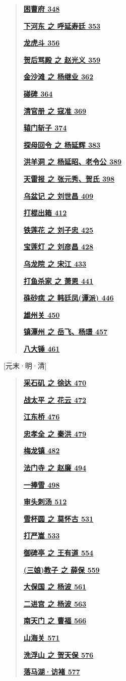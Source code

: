 \begin{quote}
\href{/l}{\textbf{困曹府 348}}

\href{/l}{\textbf{下河东 之 呼延寿廷 353}}

\href{/l}{\textbf{龙虎斗 356}}

\href{/l}{\textbf{贺后骂殿 之 赵光义 359}}

\href{/l}{\textbf{金沙滩 之 杨继业 362}}

\href{/l}{\textbf{碰碑 364}}

\href{/l}{\textbf{清官册 之 寇准 369}}

\href{/l}{\textbf{辕门斩子 374}}

\href{/l}{\textbf{探母回令 之 杨延辉 383}}

\href{/l}{\textbf{洪羊洞 之 杨延昭、老令公 389}}

\href{/l}{\textbf{天雷报 之 张元秀、贺氏 398}}

\href{/l}{\textbf{乌盆记 之 刘世昌 409}}

\href{/l}{\textbf{打棍出箱 412}}

\href{/l}{\textbf{铁莲花 之 刘子忠 425}}

\href{/l}{\textbf{宝莲灯 之 刘彦昌 428}}

\href{/l}{\textbf{乌龙院 之 宋江 433}}

\href{/l}{\textbf{打鱼杀家 之 萧恩 441}}

\href{/l}{\textbf{硃砂痣 之 韩廷凤(谭派) 446}}

\href{/l}{\textbf{雄州关 450}}

\href{/l}{\textbf{镇潭州 之 岳飞、杨璟 457}}

\href{/l}{\textbf{八大锤 461}}
\end{quote}

{[}元末·明·清{]}

\begin{quote}
\href{/l}{\textbf{采石矶 之 徐达 470}}

\href{/l}{\textbf{战太平 之 花云 472}}

\href{/l}{\textbf{江东桥 476}}

\href{/l}{\textbf{忠孝全 之 秦洪 479}}

\href{/l}{\textbf{梅龙镇 482}}

\href{/l}{\textbf{法门寺 之 赵廉 494}}

\href{/l}{\textbf{一捧雪 498}}

\href{/l}{\textbf{审头刺汤 512}}

\href{/l}{\textbf{雪杯圆 之 莫怀古 531}}

\href{/l}{\textbf{打严嵩 533}}

\href{/l}{\textbf{御碑亭 之 王有道 554}}

\href{/l}{\textbf{(三娘)教子 之 薛保 559}}

\href{/l}{\textbf{大保国 之 杨波 561}}

\href{/l}{\textbf{二进宫 之 杨波 563}}

\href{/l}{\textbf{南天门 之 曹福 566}}

\href{/l}{\textbf{山海关 571}}

\href{/l}{\textbf{洗浮山 之 贺天保 576}}

\href{/l}{\textbf{落马湖·访褚 577}}
\end{quote}

